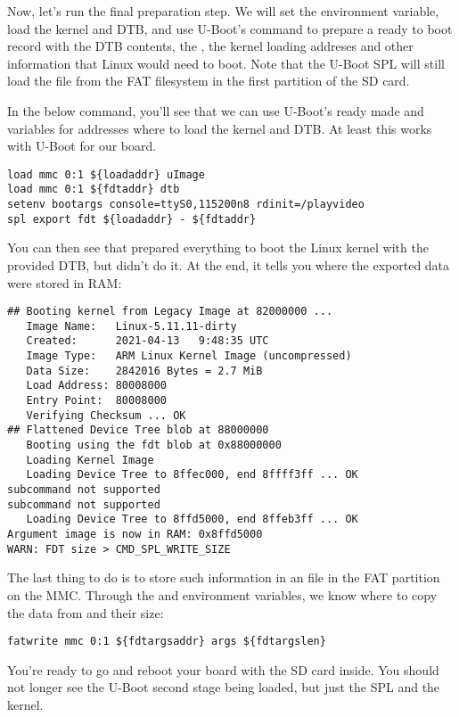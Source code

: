 Now, let's run the final preparation step. We will set the
 environment variable, load the kernel and DTB, and
use U-Boot's  command to prepare a ready to boot record
with the DTB contents, the , the kernel loading addreses
and other information that Linux would need to boot. Note that the
U-Boot SPL will still load the  file from the FAT
filesystem in the first partition of the SD card.

In the below command, you'll see that we can use U-Boot's ready made
 and  variables for addresses where to load
the kernel and DTB. At least this works with U-Boot for our board.

\begin{verbatim}
load mmc 0:1 ${loadaddr} uImage
load mmc 0:1 ${fdtaddr} dtb
setenv bootargs console=ttyS0,115200n8 rdinit=/playvideo
spl export fdt ${loadaddr} - ${fdtaddr}
\end{verbatim}

You can then see that  prepared everything to boot the
Linux kernel with the provided DTB, but didn't do it. At the end, it
tells you where the exported data were stored in RAM:

\begin{verbatim}
## Booting kernel from Legacy Image at 82000000 ...
   Image Name:   Linux-5.11.11-dirty
   Created:      2021-04-13   9:48:35 UTC
   Image Type:   ARM Linux Kernel Image (uncompressed)
   Data Size:    2842016 Bytes = 2.7 MiB
   Load Address: 80008000
   Entry Point:  80008000
   Verifying Checksum ... OK
## Flattened Device Tree blob at 88000000
   Booting using the fdt blob at 0x88000000
   Loading Kernel Image
   Loading Device Tree to 8ffec000, end 8ffff3ff ... OK
subcommand not supported
subcommand not supported
   Loading Device Tree to 8ffd5000, end 8ffeb3ff ... OK
Argument image is now in RAM: 0x8ffd5000
WARN: FDT size > CMD_SPL_WRITE_SIZE
\end{verbatim}

The last thing to do is to store such information in an  file
in the FAT partition on the MMC. Through the  and
 environment variables, we know where to copy the
data from and their size:

\begin{verbatim}
fatwrite mmc 0:1 ${fdtargsaddr} args ${fdtargslen}
\end{verbatim}

You're ready to go and reboot your board with the SD card inside.
You should not longer see the U-Boot second stage being loaded, but just
the SPL and the kernel.

